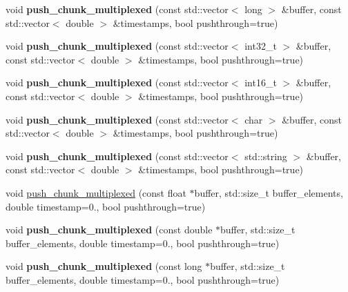 \begin{DoxyCompactItemize}
void {\bfseries push\+\_\+chunk\+\_\+multiplexed} (const std\+::vector$<$ long $>$ \&buffer, const std\+::vector$<$ double $>$ \&timestamps, bool pushthrough=true)
\item 
\mbox{\label{classlsl_1_1stream__outlet_ae3875c13d689e11c6d34181b8fadfa5d}} 
void {\bfseries push\+\_\+chunk\+\_\+multiplexed} (const std\+::vector$<$ int32\+\_\+t $>$ \&buffer, const std\+::vector$<$ double $>$ \&timestamps, bool pushthrough=true)
\item 
\mbox{\label{classlsl_1_1stream__outlet_a9d175090070f408ca7e9c8d8437c02f6}} 
void {\bfseries push\+\_\+chunk\+\_\+multiplexed} (const std\+::vector$<$ int16\+\_\+t $>$ \&buffer, const std\+::vector$<$ double $>$ \&timestamps, bool pushthrough=true)
\item 
\mbox{\label{classlsl_1_1stream__outlet_a5ceb5a7488582559846637a310056605}} 
void {\bfseries push\+\_\+chunk\+\_\+multiplexed} (const std\+::vector$<$ char $>$ \&buffer, const std\+::vector$<$ double $>$ \&timestamps, bool pushthrough=true)
\item 
\mbox{\label{classlsl_1_1stream__outlet_ac31c0f13ba9de7331e520b3b08ede811}} 
void {\bfseries push\+\_\+chunk\+\_\+multiplexed} (const std\+::vector$<$ std\+::string $>$ \&buffer, const std\+::vector$<$ double $>$ \&timestamps, bool pushthrough=true)
\item 
void \hyperlink{classlsl_1_1stream__outlet_a7ea80b891c9aaf7b4c62c715692218cc}{push\+\_\+chunk\+\_\+multiplexed} (const float $\ast$buffer, std\+::size\+\_\+t buffer\+\_\+elements, double timestamp=0., bool pushthrough=true)
\item 
\mbox{\label{classlsl_1_1stream__outlet_af5d993951e77df22ecb225c3b4aad87c}} 
void {\bfseries push\+\_\+chunk\+\_\+multiplexed} (const double $\ast$buffer, std\+::size\+\_\+t buffer\+\_\+elements, double timestamp=0., bool pushthrough=true)
\item 
\mbox{\label{classlsl_1_1stream__outlet_a4953cee1905211d533cb9bd6b0525099}} 
void {\bfseries push\+\_\+chunk\+\_\+multiplexed} (const long $\ast$buffer, std\+::size\+\_\+t buffer\+\_\+elements, double timestamp=0., bool pushthrough=true)

\end{DoxyCompactItemize}
